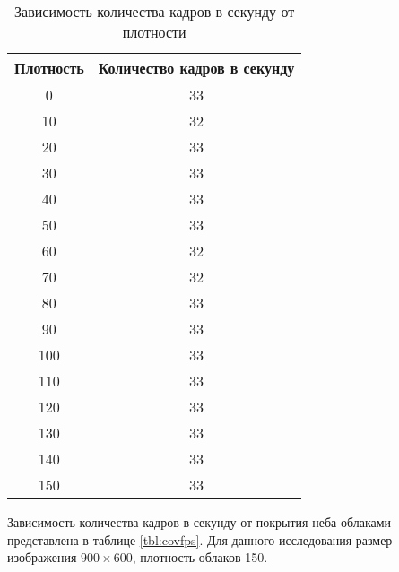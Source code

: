 \begin{table}[H]
	\begin{center}
		\begin{threeparttable}
			\captionsetup{justification=raggedright,singlelinecheck=off}
			\caption{Зависимость количества кадров в секунду от плотности}
			\label{tbl:densfps}
			\begin{tabular}{|c|c|}
				\hline
				Плотность &  Количество кадров в секунду \\
				\hline
					0 & 33 \\
					\hline
					10 & 32 \\
					\hline
					20 & 33 \\
					\hline
					30 & 33 \\
					\hline
					40 & 33 \\
					\hline
					50 & 33 \\
					\hline
					60 & 32 \\
					\hline
					70 & 32 \\
					\hline
					80 & 33 \\
					\hline
					90 & 33 \\
					\hline
					100 & 33 \\
					\hline
					110 & 33 \\
					\hline
					120 & 33 \\
					\hline
					130 & 33 \\
					\hline
					140 & 33 \\
					\hline
					150 & 33 \\
				\hline
			\end{tabular}
		\end{threeparttable}
	\end{center}
\end{table}


Зависимость количества кадров в секунду от покрытия неба облаками представлена в таблице \ref{tbl:covfps}. Для данного исследования размер изображения $900 \times 600$, плотность облаков 150.

